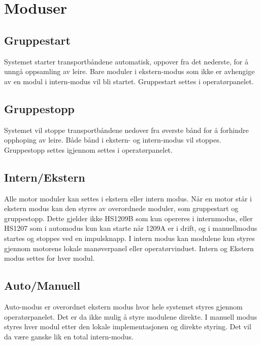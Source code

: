 \section{Moduser}
\subsection{Gruppestart}
	Systemet starter transportbåndene automatisk, oppover fra det nederste, for å unngå oppsamling av leire. Bare moduler i ekstern-modus som ikke er avhengige av en modul i intern-modus vil bli startet. Gruppestart settes i operatørpanelet.

\subsection{Gruppestopp}
	Systemet vil stoppe transportbåndene nedover fra øverste bånd for å forhindre opphoping av leire. Både bånd i ekstern- og intern-modus vil stoppes. Gruppestopp settes igjennom settes i operatørpanelet.

\subsection{Intern/Ekstern}
	Alle motor moduler kan settes i ekstern eller intern modus. Når en motor står i ekstern modus kan den styres av overordnede moduler, som gruppestart og gruppestopp. Dette gjelder ikke HS1209B som kun opereres i internmodus, eller HS1207 som i automodus kun kan starte når 1209A er i drift, og i manuellmodus startes og stoppes ved en impulsknapp. I intern modus kan modulene kun styres gjennom motorens lokale manøverpanel eller operatørvinduet. Intern og Ekstern modus settes for hver modul.

\subsection{Auto/Manuell}
	Auto-modus er overordnet ekstern modus hvor hele systemet styres gjennom operatørpanelet. Det er da ikke mulig å styre modulene direkte.
	I manuell modus styres hver modul etter den lokale implementasjonen og direkte styring. Det vil da være ganske lik en total intern-modus.

